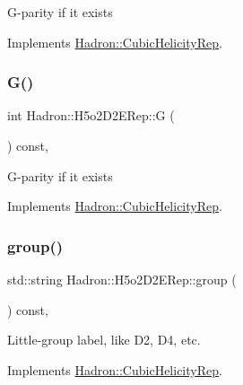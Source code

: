 G-\/parity if it exists 

Implements \mbox{\hyperlink{structHadron_1_1CubicHelicityRep_a50689f42be1e6170aa8cf6ad0597018b}{Hadron\+::\+Cubic\+Helicity\+Rep}}.

\mbox{\label{structHadron_1_1H5o2D2ERep_a200f65c803901ee97ab23f0b2b4e0c3f}} 
\subsubsection{\texorpdfstring{G()}{G()}\hspace{0.1cm}{\footnotesize\ttfamily [2/2]}}
{\footnotesize\ttfamily int Hadron\+::\+H5o2\+D2\+E\+Rep\+::G (\begin{DoxyParamCaption}{ }\end{DoxyParamCaption}) const\hspace{0.3cm}{\ttfamily [inline]}, {\ttfamily [virtual]}}

G-\/parity if it exists 

Implements \mbox{\hyperlink{structHadron_1_1CubicHelicityRep_a50689f42be1e6170aa8cf6ad0597018b}{Hadron\+::\+Cubic\+Helicity\+Rep}}.

\mbox{\label{structHadron_1_1H5o2D2ERep_aba8c064b1c4731c813d921e68d04d021}} 
\subsubsection{\texorpdfstring{group()}{group()}\hspace{0.1cm}{\footnotesize\ttfamily [1/3]}}
{\footnotesize\ttfamily std\+::string Hadron\+::\+H5o2\+D2\+E\+Rep\+::group (\begin{DoxyParamCaption}{ }\end{DoxyParamCaption}) const\hspace{0.3cm}{\ttfamily [inline]}, {\ttfamily [virtual]}}

Little-\/group label, like D2, D4, etc. 

Implements \mbox{\hyperlink{structHadron_1_1CubicHelicityRep_a101a7d76cd8ccdad0f272db44b766113}{Hadron\+::\+Cubic\+Helicity\+Rep}}.

\mbox{\label{structHadron_1_1H5o2D2ERep_aba8c064b1c4731c813d921e68d04d021}} 
